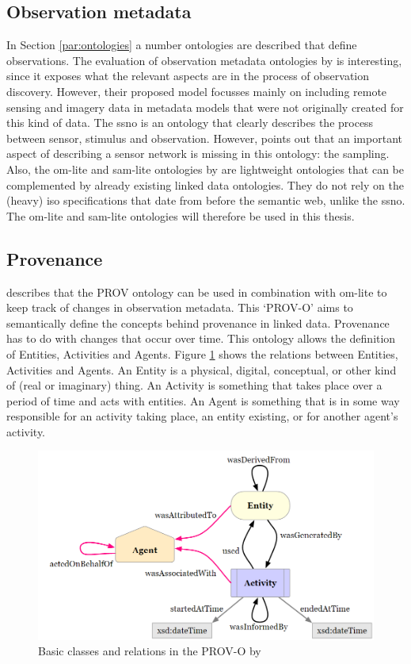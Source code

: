 \subsection{Observation metadata}
In Section \ref{par:ontologies} a number ontologies are described that define observations. The evaluation of observation metadata ontologies by \cite{SW:Hu} is interesting, since it exposes what the relevant aspects are in the process of observation discovery. However, their proposed model focusses mainly on including remote sensing and imagery data in metadata models that were not originally created for this kind of data. The \ac{ssno} is an ontology that clearly describes the process between sensor, stimulus and observation. However, \cite{SSW:Cox4} points out that an important aspect of describing a sensor network is missing in this ontology: the sampling. Also, the om-lite and sam-lite ontologies by \cite{SSW:Cox4} are lightweight ontologies that can be complemented by already existing linked data ontologies. They do not rely on the (heavy) \ac{iso} specifications that date from before the semantic web, unlike the \ac{ssno}. The om-lite and sam-lite ontologies will therefore be used in this thesis. 

\subsection{Provenance}
\label{prov-o}
\cite{SSW:Cox4} describes that the PROV ontology can be used in combination with om-lite to keep track of changes in observation metadata. This `PROV-O' aims to semantically define the concepts behind provenance in linked data. Provenance has to do with changes that occur over time. This ontology allows the definition of Entities, Activities and Agents. Figure \ref{fig:PROV} shows the relations between  Entities, Activities and Agents. An Entity is a physical, digital, conceptual, or other kind of (real or imaginary) thing. An Activity is something that takes place over a period of time and acts with entities. An Agent is something that is in some way responsible for an activity taking place, an entity existing, or for another agent's activity. 

\begin{figure}
	\centering
	\includegraphics[width=1\linewidth]{UML/PROV.png}
	\caption{Basic classes and relations in the PROV-O by \citep{LD:PROV}}
	\label{fig:PROV}
\end{figure}

